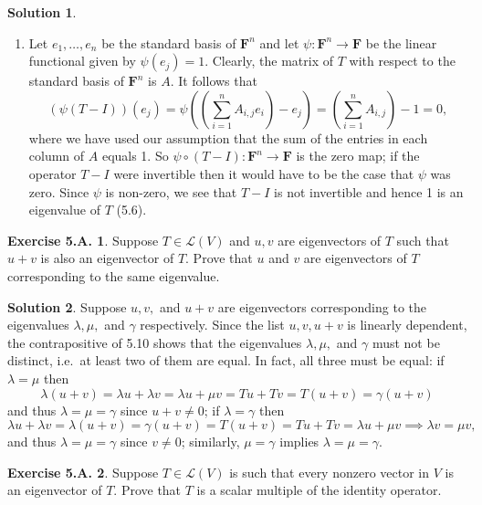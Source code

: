 \documentclass[12pt]{article}
\theoremstyle{definition}
\theoremstyle{exercise}
\newtheorem{exercise}{Exercise 5.A.}
\theoremstyle{solution}
\newtheorem*{solution}{Solution}
\newcommand{\lmap}{\mathcal{L}}
\newcommand{\F}{\mathbf{F}}
\begin{document}
\begin{solution}
\begin{enumerate}
        \item Let \( e_1, \ldots, e_n \) be the standard basis of \( \F^n \) and let \( \psi : \F^n \to \F \) be the linear functional given by \( \psi(e_j) = 1 \). Clearly, the matrix of \( T \) with respect to the standard basis of \( \F^n \) is \( A \). It follows that
        \[
            (\psi(T - I))(e_j) = \psi \left( \left( \sum_{i=1}^n A_{i,j} e_i \right) - e_j \right) = \left( \sum_{i=1}^n A_{i,j} \right) - 1 = 0,
        \]
        where we have used our assumption that the sum of the entries in each column of \( A \) equals 1. So \( \psi \circ (T - I) : \F^n \to \F \) is the zero map; if the operator \( T - I \) were invertible then it would have to be the case that \( \psi \) was zero. Since \( \psi \) is non-zero, we see that \( T - I \) is not invertible and hence 1 is an eigenvalue of \( T \) (5.6).
    \end{enumerate}
\end{solution}

\begin{exercise}
\label{ex:25}
    Suppose \( T \in \lmap(V) \) and \( u, v \) are eigenvectors of \( T \) such that \( u + v \) is also an eigenvector of \( T \). Prove that \( u \) and \( v \) are eigenvectors of \( T \) corresponding to the same eigenvalue.
\end{exercise}

\begin{solution}
    Suppose \( u, v, \) and \( u + v \) are eigenvectors corresponding to the eigenvalues \( \lambda, \mu, \) and \( \gamma \) respectively. Since the list \( u, v, u + v \) is linearly dependent, the contrapositive of 5.10 shows that the eigenvalues \( \lambda, \mu, \) and \( \gamma \) must not be distinct, i.e.\ at least two of them are equal. In fact, all three must be equal: if \( \lambda = \mu \) then
    \[
        \lambda (u + v) = \lambda u + \lambda v = \lambda u + \mu v = Tu + Tv = T(u + v) = \gamma (u + v)    
    \]
    and thus \( \lambda = \mu = \gamma \) since \( u + v \neq 0 \); if \( \lambda = \gamma \) then
    \[
        \lambda u + \lambda v = \lambda(u + v) = \gamma(u + v) = T(u + v) = Tu + Tv = \lambda u + \mu v \implies \lambda v = \mu v,
    \]
    and thus \( \lambda = \mu = \gamma \) since \( v \neq 0 \); similarly, \( \mu = \gamma \) implies \( \lambda = \mu = \gamma \).
\end{solution}

\begin{exercise}
\label{ex:26}
    Suppose \( T \in \lmap(V) \) is such that every nonzero vector in \( V \) is an eigenvector of \( T \). Prove that \( T \) is a scalar multiple of the identity operator.
\end{exercise}
\end{document}
